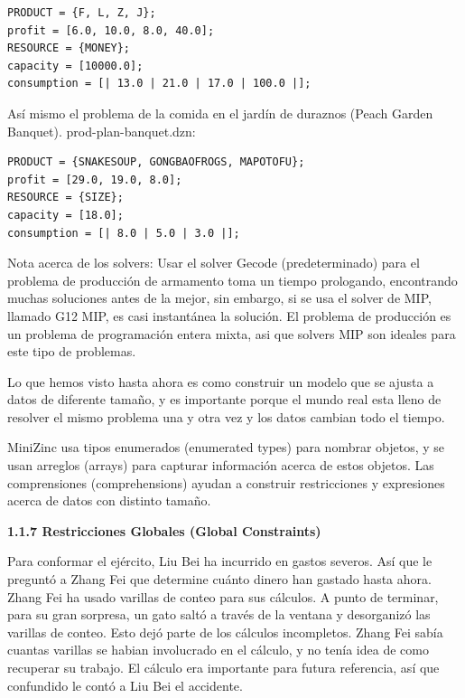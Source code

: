 \documentclass[12pt]{article}
\begin{document}
\begin{Verbatim}
PRODUCT = {F, L, Z, J};
profit = [6.0, 10.0, 8.0, 40.0];
RESOURCE = {MONEY};
capacity = [10000.0];
consumption = [| 13.0 | 21.0 | 17.0 | 100.0 |];
\end{Verbatim}

\begin{justify}
Así mismo el problema de la comida en el jardín de duraznos (Peach Garden Banquet). prod-plan-banquet.dzn:
\end{justify}

\begin{Verbatim}
PRODUCT = {SNAKESOUP, GONGBAOFROGS, MAPOTOFU};
profit = [29.0, 19.0, 8.0];
RESOURCE = {SIZE};
capacity = [18.0];
consumption = [| 8.0 | 5.0 | 3.0 |];
\end{Verbatim}

\begin{justify}
Nota acerca de los solvers: Usar el solver Gecode (predeterminado) para el problema de producción de armamento toma un tiempo prologando, encontrando muchas soluciones antes de la mejor, sin embargo, si se usa el solver de MIP, llamado G12 MIP, es casi instantánea la solución. El problema de producción es un problema de programación entera mixta, asi que solvers MIP son ideales para este tipo de problemas.
\end{justify}

\newpage

\begin{justify}
Lo que hemos visto hasta ahora es como construir un modelo que se ajusta a datos de diferente tamaño, y es importante porque el mundo real esta lleno de resolver el mismo problema una y otra vez y los datos cambian todo el tiempo. 
\end{justify}

\begin{justify}
MiniZinc usa tipos enumerados (enumerated types) para nombrar objetos, y se usan arreglos (arrays) para capturar información acerca de estos objetos. Las comprensiones (comprehensions) ayudan a construir restricciones y expresiones acerca de datos con distinto tamaño.  
\end{justify}

\newpage

\textbf{1.1.7 Restricciones Globales (Global Constraints)}

\begin{justify}
Para conformar el ejército, Liu Bei ha incurrido en gastos severos. Así que le preguntó a Zhang Fei que determine cuánto dinero han gastado hasta ahora. Zhang Fei ha usado varillas de conteo para sus cálculos. A punto de terminar, para su gran sorpresa, un gato saltó a través de la ventana y desorganizó las varillas de conteo. Esto dejó parte de los cálculos incompletos. Zhang Fei sabía cuantas varillas se habian involucrado en el cálculo, y no tenía idea de como recuperar su trabajo. El cálculo era importante para futura referencia, así que confundido le contó a Liu Bei el accidente. 
\end{justify}
\end{document}
